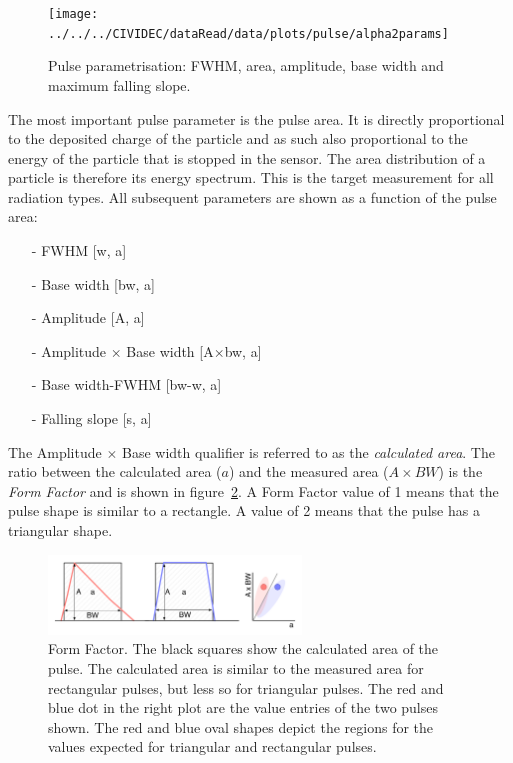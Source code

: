 \begin{figure}[!t]
\centering
\texttt{[image: ../../../CIVIDEC/dataRead/data/plots/pulse/alpha2params]}
\caption{Pulse parametrisation: FWHM, area, amplitude, base width and maximum falling slope.}
\label{fig:params}
\end{figure}

The most important pulse parameter is the pulse area. It is directly proportional to the deposited charge of the particle and as such also proportional to the energy of the particle that is stopped in the sensor. The area distribution of a particle is therefore its energy spectrum. This is the target measurement for all radiation types. All subsequent parameters are shown as a function of the pulse area: 
\begin{itemize}\setlength\itemsep{0.1em}
\item[-] FWHM [w, a]
\item[-] Base width [bw, a]
\item[-] Amplitude [A, a]
\item[-] Amplitude $\times$ Base width [A$\times$bw, a]
\item[-] Base width-FWHM [bw-w, a]
\item[-] Falling slope [s, a]
\end{itemize}
The Amplitude $\times$ Base width qualifier is referred to as the \emph{calculated area}. The ratio between the calculated area ($a$) and the measured area ($A\times BW$) is the \emph{Form Factor} and is shown in figure~\ref{fig:formfac1}. A Form Factor value of 1 means that the pulse shape is similar to a rectangle. A value of 2 means that the pulse has a triangular shape. 



\begin{figure}[!t]
\centering
\includegraphics[width=0.6\textwidth]{05_current_monitoring/plots/formfac1}
\caption{Form Factor. The black squares show the calculated area of the pulse. The calculated area is similar to the measured area for rectangular pulses, but less so for triangular pulses. The red and blue dot in the right plot are the value entries of the two pulses shown. The red and blue oval shapes depict the regions for the values expected for triangular and rectangular pulses. %
}
\label{fig:formfac1}
\end{figure}

